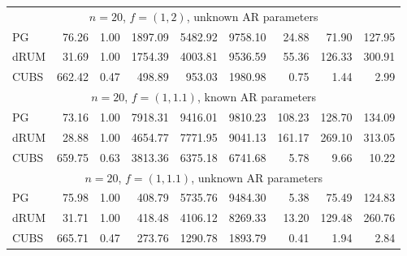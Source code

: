 \documentclass[12pt]{article}
\begin{document}
\begin{table}
\begin{center}
\begin{tabular}{l r r r r r r r r }
\multicolumn{9}{c}{$n=20$, $f = (1,2)$, unknown AR parameters} \\
             PG   &    76.26 &     1.00 &   1897.09 &   5482.92 &   9758.10 &     24.88 &     71.90 &    127.95 \\ 
           dRUM   &    31.69 &     1.00 &   1754.39 &   4003.81 &   9536.59 &     55.36 &    126.33 &    300.91 \\ 
           CUBS   &   662.42 &     0.47 &    498.89 &    953.03 &   1980.98 &      0.75 &      1.44 &      2.99
 \\ %


\multicolumn{9}{c}{$n=20$, $f = (1,1.1)$, known AR parameters} \\
             PG   &    73.16 &     1.00 &   7918.31 &   9416.01 &   9810.23 &    108.23 &    128.70 &    134.09 \\ 
           dRUM   &    28.88 &     1.00 &   4654.77 &   7771.95 &   9041.13 &    161.17 &    269.10 &    313.05 \\ 
           CUBS   &   659.75 &     0.63 &   3813.36 &   6375.18 &   6741.68 &      5.78 &      9.66 &     10.22
 \\ %

\multicolumn{9}{c}{$n=20$, $f = (1,1.1)$, unknown AR parameters} \\
             PG   &    75.98 &     1.00 &    408.79 &   5735.76 &   9484.30 &      5.38 &     75.49 &    124.83 \\ 
           dRUM   &    31.71 &     1.00 &    418.48 &   4106.12 &   8269.33 &     13.20 &    129.48 &    260.76 \\ 
           CUBS   &   665.71 &     0.47 &    273.76 &   1290.78 &   1893.79 &      0.41 &      1.94 &      2.84
 \end{tabular}
\end{center}


\end{table}
\end{document}

